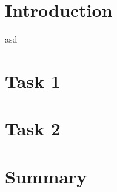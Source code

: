 \documentclass[fleqn,12pt]{article} %
\begin{document}

%


\pagebreak
\section{Introduction}
asd


\section{Task 1}


\section{Task 2}


\section{Summary}


%
\end{document}
